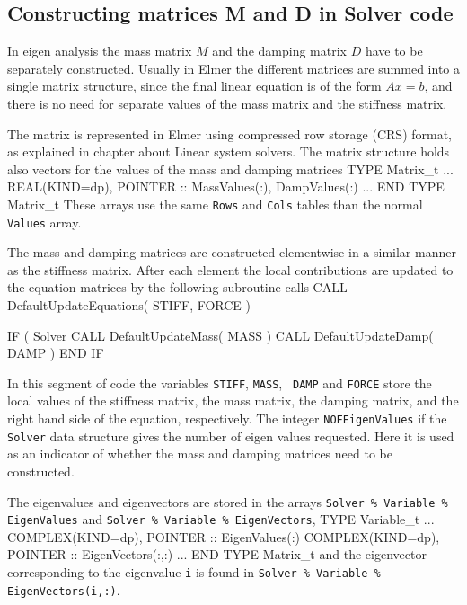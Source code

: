 \sifend


\begin{versiona}

\section{Constructing matrices M and D in Solver code}

In eigen analysis the mass matrix $M$ and the damping matrix $D$ have
to be separately constructed. Usually in Elmer the different matrices
are summed into a single matrix structure, since the final linear
equation is of the form $Ax=b$, and there is no need for separate
values of the mass matrix and the stiffness matrix. 

The matrix is represented in Elmer using compressed row storage (CRS)
format, as explained in chapter about Linear system solvers. The
matrix structure holds also vectors for the values of the mass and
damping matrices
\ttbegin
  TYPE Matrix_t
     ...
    REAL(KIND=dp),  POINTER :: MassValues(:), DampValues(:)
     ...
  END TYPE Matrix_t
\ttend
These arrays use the same {\tt Rows} and {\tt Cols} tables than the
normal {\tt Values} array.

The mass and damping matrices are constructed elementwise in a
similar manner as the stiffness matrix. After each element the local
contributions are updated to the equation matrices by the following
subroutine calls
\ttbegin
  CALL DefaultUpdateEquations( STIFF, FORCE )

  IF ( Solver %
    CALL DefaultUpdateMass( MASS )
    CALL DefaultUpdateDamp( DAMP )
  END IF
\ttend

In this segment of code the variables {\tt STIFF}, {\tt MASS}, {\tt
DAMP} and {\tt FORCE} store the local values of the stiffness matrix,
the mass matrix, the damping matrix, and the right hand side of the
equation, respectively. The integer {\tt NOFEigenValues} if the {\tt
Solver} data structure gives the number of eigen values
requested. Here it is used as an indicator of whether the mass and
damping matrices need to be constructed.

The eigenvalues and eigenvectors are stored in the arrays {\tt Solver
\% Variable \% EigenValues} and {\tt Solver \% Variable \% EigenVectors},
\ttbegin
  TYPE Variable_t
     ...
    COMPLEX(KIND=dp), POINTER :: EigenValues(:)
    COMPLEX(KIND=dp), POINTER :: EigenVectors(:,:)
     ...
  END TYPE Matrix_t
\ttend
and the eigenvector corresponding to the eigenvalue {\tt i}
is found in {\tt Solver \% Variable \% EigenVectors(i,:)}.




\end{versiona}
